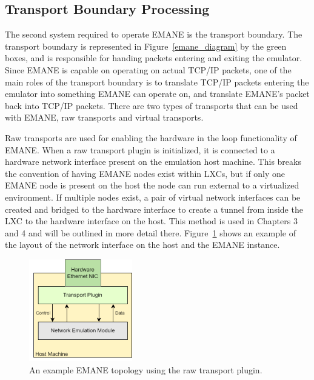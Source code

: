 \subsection{Transport Boundary Processing}
The second system required to operate EMANE is the transport boundary.
The transport boundary is represented in Figure~\ref{emane_diagram} by the green boxes, and is responsible for handing packets entering and exiting the emulator.
Since EMANE is capable on operating on actual TCP/IP packets, one of the main roles of the transport boundary is to translate TCP/IP packets entering the emulator into something EMANE can operate on, and translate EMANE's packet back into TCP/IP packets.
There are two types of transports that can be used with EMANE, raw transports and virtual transports.\par
Raw transports are used for enabling the hardware in the loop functionality of EMANE.
When a raw transport plugin is initialized, it is connected to a hardware network interface present on the emulation host machine.
This breaks the convention of having EMANE nodes exist within LXCs, but if only one EMANE node is present on the host the node can run external to a virtualized environment.
If multiple nodes exist, a pair of virtual network interfaces can be created and bridged to the hardware interface to create a tunnel from inside the LXC to the hardware interface on the host.
This method is used in Chapters 3 and 4 and will be outlined in more detail there.
Figure~\ref{emane_raw_transport} shows an example of the layout of the network interface on the host and the EMANE instance.

\begin{figure}[!ht]
    \centering
    \includegraphics[width=0.4\textwidth,keepaspectratio]{Images/Chpt2/RawTransport.png}
    \caption{An example EMANE topology using the raw transport plugin.}
    \label{emane_raw_transport}
\end{figure}


